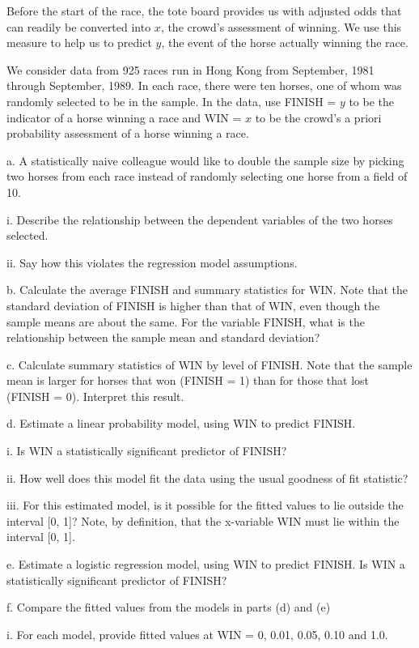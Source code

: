 \begin{exercises}
Before the start of the race, the tote board provides us with
adjusted odds that can readily be converted into $x$, the crowd's
assessment of winning. We use this measure to help us to predict
$y$, the event of the horse actually winning the race.

We consider data from 925 races run in Hong Kong from September,
1981 through September, 1989. In each race, there were ten horses,
one of whom was randomly selected to be in the sample. In the data,
use FINISH = $y$ to be the indicator of a horse winning a race and
WIN = $x$ to be the crowd's a priori probability assessment of a
horse winning a race.


a. A statistically naive colleague would like to double the sample
size by picking two horses from each race instead of randomly
selecting one horse from a field of 10.

i. Describe the relationship between the dependent variables of the
two horses selected.

ii. Say how this violates the regression model assumptions.

b. Calculate the average FINISH and summary statistics for WIN. Note
that the standard deviation of FINISH is higher than that of WIN,
even though the sample means are about the same. For the variable
FINISH, what is the relationship between the sample mean and
standard deviation?

c. Calculate summary statistics of WIN by level of FINISH. Note that
the sample mean is larger for horses that won (FINISH = 1) than for
those that lost (FINISH = 0). Interpret this result.

d. Estimate a linear probability model, using WIN to predict FINISH.

i. Is WIN a statistically significant predictor of FINISH?

ii. How well does this model fit the data using the usual goodness
of fit statistic?

iii. For this estimated model, is it possible for the fitted values
to lie outside the interval [0, 1]? Note, by definition, that the
x-variable WIN must lie within the interval [0, 1].

e. Estimate a logistic regression model, using WIN to predict
FINISH. Is WIN a statistically significant predictor of FINISH?

f. Compare the fitted values from the models in parts (d) and (e)

i. For each model, provide fitted values at WIN =  0, 0.01, 0.05,
0.10 and 1.0.


\end{exercises}

